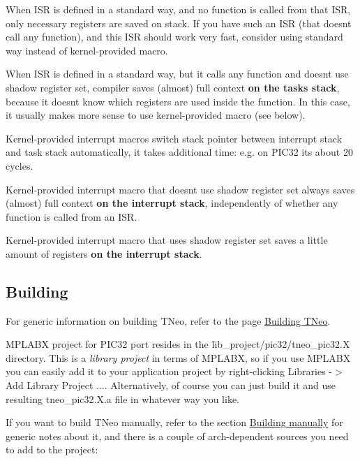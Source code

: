 \begin{DoxyItemize}
\item When I\+SR is defined in a standard way, and no function is called from that I\+SR, only necessary registers are saved on stack. If you have such an I\+SR (that doesn\textquotesingle{}t call any function), and this I\+SR should work very fast, consider using standard way instead of kernel-\/provided macro.
\item When I\+SR is defined in a standard way, but it calls any function and doesn\textquotesingle{}t use shadow register set, compiler saves (almost) full context {\bfseries on the task\textquotesingle{}s stack}, because it doesn\textquotesingle{}t know which registers are used inside the function. In this case, it usually makes more sense to use kernel-\/provided macro (see below).
\item Kernel-\/provided interrupt macros switch stack pointer between interrupt stack and task stack automatically, it takes additional time\+: e.\+g. on P\+I\+C32 it\textquotesingle{}s about 20 cycles.
\item Kernel-\/provided interrupt macro that doesn\textquotesingle{}t use shadow register set always saves (almost) full context {\bfseries on the interrupt stack}, independently of whether any function is called from an I\+SR.
\item Kernel-\/provided interrupt macro that uses shadow register set saves a little amount of registers {\bfseries on the interrupt stack}.
\end{DoxyItemize}\hypertarget{arch_specific_pic32_building}{}\subsection{Building}\label{arch_specific_pic32_building}
For generic information on building T\+Neo, refer to the page \hyperlink{building}{Building T\+Neo}.

M\+P\+L\+A\+BX project for P\+I\+C32 port resides in the {\ttfamily lib\+\_\+project/pic32/tneo\+\_\+pic32.\+X} directory. This is a {\itshape library project} in terms of M\+P\+L\+A\+BX, so if you use M\+P\+L\+A\+BX you can easily add it to your application project by right-\/clicking {\ttfamily Libraries -\/$>$ Add Library Project ...}. Alternatively, of course you can just build it and use resulting {\ttfamily tneo\+\_\+pic32.\+X.\+a} file in whatever way you like.

If you want to build T\+Neo manually, refer to the section \hyperlink{building_building_generic__manual}{Building manually} for generic notes about it, and there is a couple of arch-\/dependent sources you need to add to the project\+:


